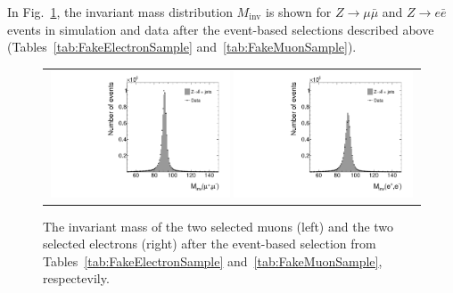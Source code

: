 In Fig.~\ref{fig:Zpeak}, the invariant mass distribution $M_{\text{inv}}$ is shown for $Z\rightarrow \mu \bar{\mu}$ and $Z\rightarrow e \bar{e}$ events in simulation and data after the event-based selections described above (Tables~\ref{tab:FakeElectronSample} and~\ref{tab:FakeMuonSample}).
\begin{figure}[!tb]
  \centering 
  \begin{tabular}{c}
    \includegraphics[width=0.49\textwidth]{figures/analysis_2/Background/hMinvMuons_lin_chiTracksnoSelectionTightMuons.pdf}
    \includegraphics[width=0.49\textwidth]{figures/analysis_2/Background/hMinvElectrons_lin_chiTracksnoSelectionTightElectrons.pdf}
  \end{tabular}
  \caption{The invariant mass of the two selected muons (left) and the two selected electrons (right) after the event-based selection from Tables~\ref{tab:FakeElectronSample} and~\ref{tab:FakeMuonSample}, respectevily.}
  \label{fig:Zpeak}
\end{figure}


